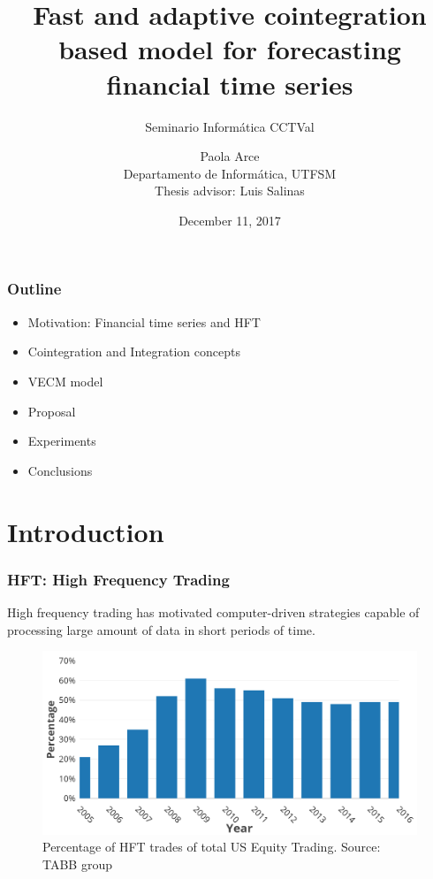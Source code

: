 \documentclass{beamer}
\author[Paola Arce]{Paola Arce \\ Departamento de Inform\'atica, UTFSM \\ Thesis advisor: Luis Salinas}
\date{December 11, 2017}
\title[Thesis defense]{Fast and adaptive cointegration based model for forecasting financial time series}
\subtitle{Seminario Inform\'atica CCTVal}
\begin{document}
\begin{frame}[plain]
\titlepage
\end{frame}

\begin{frame}
\frametitle{Outline}
\begin{itemize}
\item Motivation: Financial time series and HFT
\item Cointegration and Integration concepts
\item VECM model
\item Proposal
\item Experiments
\item Conclusions
\end{itemize}
\end{frame}

\section{Introduction}

\begin{frame}
\frametitle{HFT: High Frequency Trading}
High frequency trading has motivated computer-driven strategies capable of processing large amount of data in short periods of time.
\begin{figure}
\includegraphics[width=0.7\paperwidth]{img/HFTmarket}
\caption{Percentage of HFT trades of total US Equity Trading. Source: TABB group}
\end{figure}
\end{frame}
\end{document}
